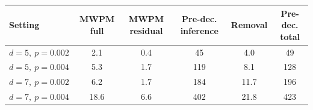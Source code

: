 \begin{tabular}{lccccc}
\toprule
Setting & MWPM full & MWPM residual & Pre-dec. inference & Removal & Pre-dec. total \\
\midrule
$d=5,\ p=0.002$ & 2.1 & 0.4 & 45 & 4.0 & 49 \\
$d=5,\ p=0.004$ & 5.3 & 1.7 & 119 & 8.1 & 128 \\
$d=7,\ p=0.002$ & 6.2 & 1.7 & 184 & 11.7 & 196 \\
$d=7,\ p=0.004$ & 18.6 & 6.6 & 402 & 21.8 & 423 \\
\bottomrule
\end{tabular}

